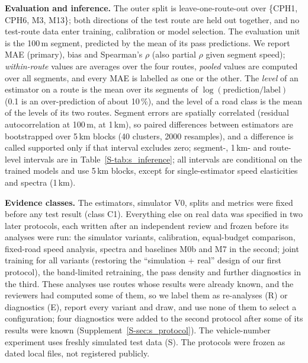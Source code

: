 \textbf{Evaluation and inference.}
The outer split is leave-one-route-out over \{CPH1, CPH6, M3, M13\}; both directions of the test route are held out together, and no test-route data enter training, calibration or model selection.
The evaluation unit is the 100\,m segment, predicted by the mean of its pass predictions.
We report MAE (primary), bias and Spearman's $\rho$ (also partial $\rho$ given segment speed); \emph{within-route} values are averages over the four routes, \emph{pooled} values are computed over all \liraSegments{} segments, and every MAE is labelled as one or the other.
The \emph{level} of an estimator on a route is the mean over its segments of $\log(\text{prediction}/\text{label})$ (0.1 is an over-prediction of about 10\,\%), and the level of a road class is the mean of the levels of its two routes.
Segment errors are spatially correlated (residual autocorrelation \acfGbmHundred{} at 100\,m, \acfGbmKm{} at 1\,km), so paired differences between estimators are bootstrapped over 5\,km blocks (40 clusters, 2000 resamples), and a difference is called supported only if that interval excludes zero; segment-, 1\,km- and route-level intervals are in Table~\ref{S-tab:s_inference}; all intervals are conditional on the trained models and use 5\,km blocks, except for single-estimator speed elasticities and spectra (1\,km).

\textbf{Evidence classes.}
The estimators, simulator V0, splits and metrics were fixed before any test result (class C1).
Everything else on real data was specified in two later protocols, each written after an independent review and frozen before its analyses were run: the simulator variants, calibration, equal-budget comparison, fixed-road speed analysis, spectra and baselines M0b and M7 in the second; joint training for all variants (restoring the ``simulation + real'' design of our first protocol), the band-limited retraining, the pass density and further diagnostics in the third.
These analyses use routes whose results were already known, and the reviewers had computed some of them, so we label them as re-analyses (R) or diagnostics (E), report every variant and draw, and use none of them to select a configuration; four diagnostics were added to the second protocol after some of its results were known (Supplement~\ref{S-sec:s_protocol}).
The vehicle-number experiment uses freshly simulated test data (S).
The protocols were frozen as dated local files, not registered publicly.
